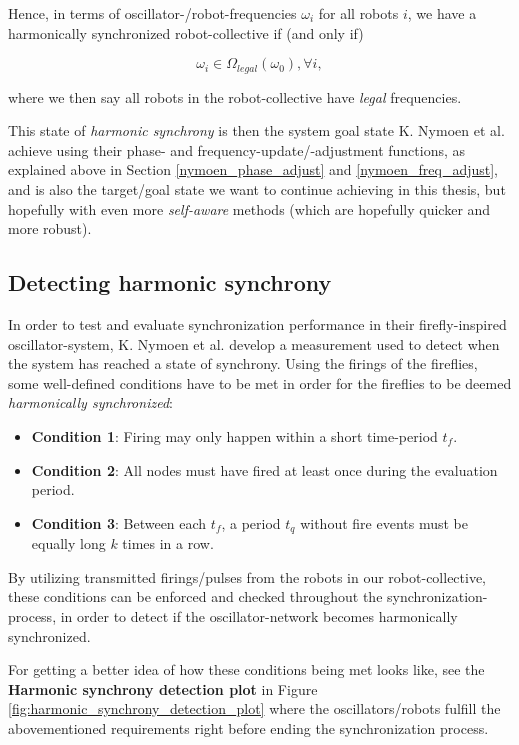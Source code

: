 Hence, in terms of oscillator-/robot-frequencies $\omega_i$ for all robots $i$, we have a harmonically synchronized robot-collective if (and only if)

\begin{equation}\label{synced_freqs}
\omega_i \in \Omega_{legal}(\omega_0) , \forall i ,
\end{equation}

where we then say all robots in the robot-collective have \textit{legal} frequencies.



This state of \textit{harmonic synchrony} is then the system goal state K. Nymoen et al. achieve using their phase- and frequency-update/-adjustment functions, as explained above in Section \ref{nymoen_phase_adjust} and \ref{nymoen_freq_adjust}, and is also the target/goal state we want to continue achieving in this thesis, but hopefully with even more \textit{self-aware} methods (which are hopefully quicker and more robust).


	\subsection{Detecting harmonic synchrony}
	\label{subsec:harmonic_synchrony}
	In order to test and evaluate synchronization performance in their firefly-inspired oscillator-system, K. Nymoen et al. \cite{nymoen_synch} develop a measurement used to detect when the system has reached a state of synchrony. Using the firings of the fireflies, some well-defined conditions have to be met in order for the fireflies to be deemed \textit{harmonically synchronized}:
	\begin{itemize}
		\item \textbf{Condition 1}: Firing may only happen within a short time-period $t_f$.
		\item \textbf{Condition 2}: All nodes must have fired at least once during the evaluation period.
		\item \textbf{Condition 3}: Between each $t_f$, a period $t_q$ without fire events must be equally long $k$ times in a row.
	\end{itemize}
	
	By utilizing transmitted firings/pulses from the robots in our robot-collective, these conditions can be enforced and checked throughout the synchronization-process, in order to detect if the oscillator-network becomes harmonically synchronized.
	
	For getting a better idea of how these conditions being met looks like, see the \textbf{Harmonic synchrony detection plot} in Figure \ref{fig:harmonic_synchrony_detection_plot} where the oscillators/robots fulfill the abovementioned requirements right before ending the synchronization process.
	
